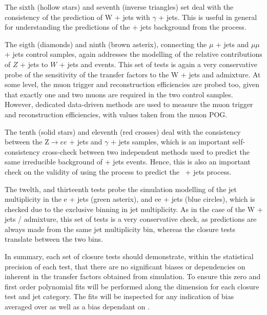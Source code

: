 The sixth (hollow stars) and seventh (inverse triangles) set deal 
with the consistency of the prediction of W + jets with $\gamma$ + jets.
This is useful in general for understanding the predictions of the \znunu + jets background from the \gj process. 

The eigth (diamonds) and ninth (brown asterix), connecting the $\mu$ + jets 
and $\mu\mu$ + jets control samples, again addresses the modelling of 
the relative contributions of $Z$ + jets to $W$ + jets and \ttbar events.
This set of tests is again a very conservative probe of the sensitivity of the
transfer factors to the W + jets and \ttbar admixture. At some
level, the muon trigger and reconstruction efficiencies are probed
too, given that exactly one and two muons are required in the two
control samples. However, dedicated data-driven methods are used to
measure the muon trigger and reconstruction efficiencies, with values
taken from the muon POG.

The tenth (solid stars) and eleventh (red crosses) deal  with the consistency between the
Z$\rightarrow ee$ + jets and $\gamma$ + jets samples, which is an
important self-consistency cross-check between two independent methods
used to predict the same irreducible background of \znunu + jets
events. Hence, this is also an important check on the validity of
using the \gj process to predict the \znunu\, + jets process.

The twelth, and thirteenth tests probe the simulation modelling of
the jet multiplicity in the e + jets (green asterix), and ee + jets 
(blue circles), which is checked due to the exclusive binning in jet multiplicity.
As in the case of the W + jets / \ttbar admixture, this set of tests is a very 
conservative check, as predictions are always made from the same 
jet multiplicity bin, whereas the closure tests translate between the two bins.

In summary, each set of closure tests should demonstrate, within the
statistical precision of each test, that there are no significant
biases or dependencies on \scalht inherent in the transfer factors
obtained from simulation. To ensure this zero and first order polynomial
fits will be performed along the \scalht dimension for each closure test 
and jet category. The fits will be inspected for any indication of bias 
averaged over \scalht as well as a bias dependant on \scalht. 

